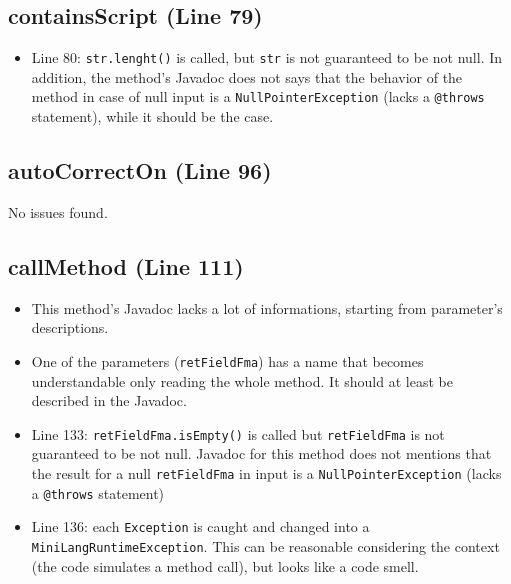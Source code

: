 \documentclass[11pt]{article} %
\begin{document}
\subsection{containsScript (Line 79)}
\begin{itemize}
	\item Line 80: \texttt{str.lenght()} is called, but \texttt{str} is not guaranteed to be not null. In addition, the method's Javadoc does not says that the behavior of the method in case of null input is a \texttt{NullPointerException} (lacks a \texttt{@throws} statement), while it should be the case.
\end{itemize}

\subsection{autoCorrectOn (Line 96)}
No issues found.

\subsection{callMethod (Line 111)}
\begin{itemize}
	\item This method's Javadoc lacks a lot of informations, starting from parameter's descriptions.
	\item One of the parameters (\texttt{retFieldFma}) has a name that becomes understandable only reading the whole method. It should at least be described in the Javadoc.
	\item Line 133: \texttt{retFieldFma.isEmpty()} is called but \texttt{retFieldFma} is not guaranteed to be not null. Javadoc for this method does not mentions that the result for a null \texttt{retFieldFma} in input is a \texttt{NullPointerException} (lacks a \texttt{@throws} statement)
	\item Line 136: each \texttt{Exception} is caught and changed into a \texttt{MiniLangRuntimeException}. This can be reasonable considering the context (the code simulates a method call), but looks like a code smell.
\end{itemize}
\end{document}
